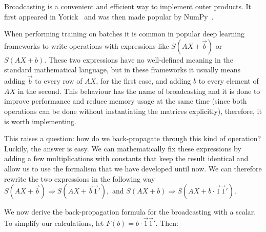 \documentclass[pdflatex,sn-mathphys-num]{sn-jnl}%
\theoremstyle{thmstyleone}%
\theoremstyle{thmstyletwo}%
\theoremstyle{thmstylethree}%
\begin{document}

Broadcasting is a convenient and efficient way to implement outer products. It
first appeared in Yorick~\cite{munro1995} and was then made popular by
NumPy~\cite{harris2020}.

When performing training on batches it is common in popular deep learning frameworks to write operations with expressions like \(S(AX + \vec
b)\) or \(S(AX + b)\). These two expressions have no well-defined meaning in the standard mathematical language, but in these frameworks it usually means adding \(\vec b\) to every row of \(AX\), for the first case, and adding \(b\) to every element of \(AX\) in the second. This behaviour has the name of broadcasting and it is
done to improve performance and reduce memory usage at the same time (since both
operations can be done without instantiating the matrices explicitly),
therefore, it is worth implementing.

This raises a question: how do we back-propagate through this kind of operation?
Luckily, the answer is easy. We can mathematically fix these expressions by
adding a few multiplications with constants that keep the result identical and
allow us to use the formalism that we have developed until now.  We can
therefore rewrite the two expressions in the following way \(S(AX + \vec b)
\Rightarrow S(AX + \vec b \vec 1'),\) and \(S(AX + b) \Rightarrow S(AX + b \cdot
\vec 1 \vec 1').\)

We now derive the back-propagation formula for the broadcasting with a scalar. To simplify our calculations, let  \(F(b) = b \cdot \vec 1 \vec 1'\). Then:
\end{document}
